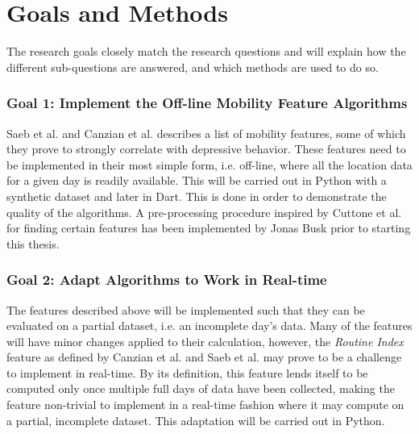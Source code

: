 \section{Goals and Methods}


The research goals closely match the research questions and will explain how the different sub-questions are answered, and which methods are used to do so.

\subsubsection*{Goal 1: Implement the Off-line Mobility Feature Algorithms}
Saeb et al. \cite{Saeb2015} and Canzian et al. \cite{Canzian2015} describes a list of mobility features, some of which they prove to strongly correlate with depressive behavior. These features need to be implemented in their most simple form, i.e. off-line, where all the location data for a given day is readily available. This will be carried out in Python with a synthetic dataset and later in Dart. This is done in order to demonstrate the quality of the algorithms. A pre-processing procedure inspired by Cuttone et al. \cite{sparse-location-2014} for finding certain features has been implemented by Jonas Busk prior to starting this thesis. 

\subsubsection*{Goal 2: Adapt Algorithms to Work in Real-time}
The features described above will be implemented such that they can be evaluated on a partial dataset, i.e. an incomplete day's data. Many of the features will have minor changes applied to their calculation, however, the \textit{Routine Index} feature as defined by Canzian et al.\cite{Canzian2015} and Saeb et al. \cite{Saeb2015} may prove to be a challenge to implement in real-time. By its definition, this feature lends itself to be computed only once multiple full days of data have been collected, making the feature non-trivial to implement in a real-time fashion where it may compute on a partial, incomplete dataset. This adaptation will be carried out in Python.

